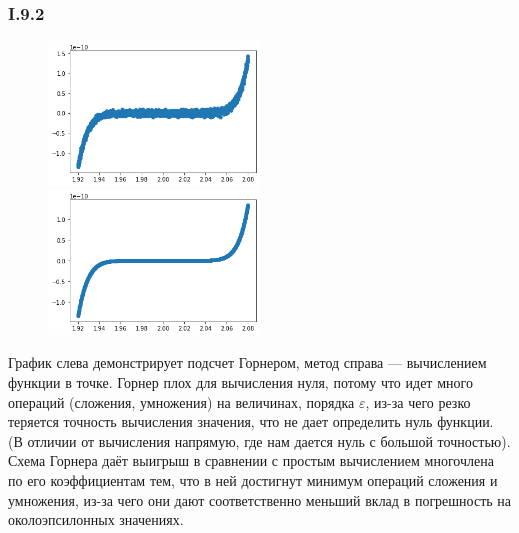 \subsubsection*{I.9.2}
\begin{figure}[H]
	\includegraphics[width=0.5\textwidth]{parts/img/I_9_2_1.png}
	\includegraphics[width=0.5\textwidth]{parts/img/I_9_2_2.png}
\end{figure}
График слева демонстрирует подсчет Горнером, метод справа --- вычислением функции в точке. Горнер плох для вычисления нуля, потому что идет много операций (сложения, умножения) на величинах, порядка $\varepsilon$, из-за чего резко теряется точность вычисления значения, что не дает определить нуль функции. (В отличии от вычисления напрямую, где нам дается нуль с большой точностью). Схема Горнера даёт выигрыш в сравнении с простым вычислением многочлена по его коэффициентам тем, что в ней достигнут минимум операций сложения и умножения, из-за чего они дают соответственно меньший вклад в погрешность на околоэпсилонных значениях. 
